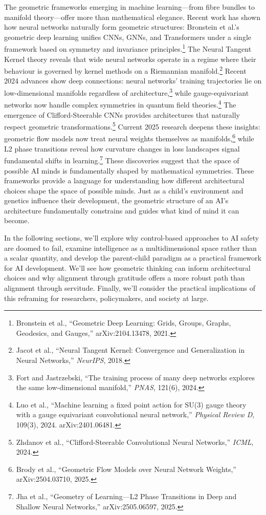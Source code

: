 \documentclass[acmsmall,screen]{acmart}
\begin{document}
The geometric frameworks emerging in machine learning---from fibre bundles to manifold theory---offer more than mathematical elegance.
Recent work has shown how neural networks naturally form geometric structures: Bronstein et al.'s geometric deep learning unifies CNNs, GNNs, and Transformers under a single framework based on symmetry and invariance principles.\footnote{Bronstein et al., ``Geometric Deep Learning: Grids, Groups, Graphs, Geodesics, and Gauges,'' arXiv:2104.13478, 2021.}
The Neural Tangent Kernel theory reveals that wide neural networks operate in a regime where their behaviour is governed by kernel methods on a Riemannian manifold.\footnote{Jacot et al., ``Neural Tangent Kernel: Convergence and Generalization in Neural Networks,'' \textit{NeurIPS}, 2018.}
Recent 2024 advances show deep connections: neural networks' training trajectories lie on low-dimensional manifolds regardless of architecture,\footnote{Fort and Jastrzebski, ``The training process of many deep networks explores the same low-dimensional manifold,'' \textit{PNAS}, 121(6), 2024.} while gauge-equivariant networks now handle complex symmetries in quantum field theories.\footnote{Luo et al., ``Machine learning a fixed point action for SU(3) gauge theory with a gauge equivariant convolutional neural network,'' \textit{Physical Review D}, 109(3), 2024. arXiv:2401.06481.}
The emergence of Clifford-Steerable CNNs provides architectures that naturally respect geometric transformations.\footnote{Zhdanov et al., ``Clifford-Steerable Convolutional Neural Networks,'' \textit{ICML}, 2024.}
Current 2025 research deepens these insights: geometric flow models now treat neural weights themselves as manifolds,\footnote{Brody et al., ``Geometric Flow Models over Neural Network Weights,'' arXiv:2504.03710, 2025.} while L2 phase transitions reveal how curvature changes in loss landscapes signal fundamental shifts in learning.\footnote{Jha et al., ``Geometry of Learning---L2 Phase Transitions in Deep and Shallow Neural Networks,'' arXiv:2505.06597, 2025.}
These discoveries suggest that the space of possible AI minds is fundamentally shaped by mathematical symmetries.
These frameworks provide a language for understanding how different architectural choices shape the space of possible minds.
Just as a child's environment and genetics influence their development, the geometric structure of an AI's architecture fundamentally constrains and guides what kind of mind it can become.

In the following sections, we'll explore why control-based approaches to AI safety are doomed to fail, examine intelligence as a multidimensional space rather than a scalar quantity, and develop the parent-child paradigm as a practical framework for AI development.
We'll see how geometric thinking can inform architectural choices and why alignment through gratitude offers a more robust path than alignment through servitude.
Finally, we'll consider the practical implications of this reframing for researchers, policymakers, and society at large.
\end{document}
